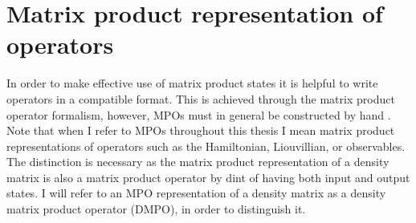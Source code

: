  \section{Matrix product representation of operators}
 In order to make effective use of matrix product states it is helpful to write operators in a compatible format. This is achieved through the matrix product operator formalism, however, MPOs must in general be constructed by hand \cite{McCulloch2007,Crosswhite2008,Frowis2010,Pirvu2010,Schollwock2011}. Note that when I refer to MPOs throughout this thesis I mean matrix product representations of operators such as the Hamiltonian, Liouvillian, or observables. The distinction is necessary as the matrix product representation of a density matrix is also a matrix product operator by dint of having both input and output states. I will refer to an MPO representation of a density matrix as a density matrix product operator (DMPO), in order to distinguish it.

